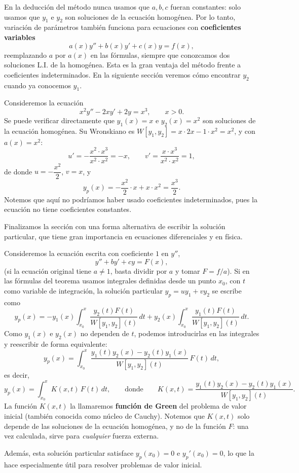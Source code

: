 \begin{remark}
    En la deducci\'on del m\'etodo nunca usamos que $a,b,c$ fueran constantes: solo usamos que $y_1$ e $y_2$ son soluciones de la ecuaci\'on homog\'enea. Por lo tanto, variaci\'on de par\'ametros tambi\'en funciona para ecuaciones con \textbf{coeficientes variables}
    \[
    a(x)y''+b(x)y'+c(x)y=f(x),
    \]
    reemplazando $a$ por $a(x)$ en las f\'ormulas, siempre que conozcamos dos soluciones L.I. de la homog\'enea. Esta es la gran ventaja del m\'etodo frente a coeficientes indeterminados. En la siguiente secci\'on veremos c\'omo encontrar $y_2$ cuando ya conocemos $y_1$.
\end{remark}

\begin{example}
    Consideremos la ecuaci\'on
    \[
    x^2y''-2xy'+2y=x^3,\qquad x>0.
    \]
    Se puede verificar directamente que $y_1(x)=x$ e $y_2(x)=x^2$ son soluciones de la ecuaci\'on homog\'enea. Su Wronskiano es $W[y_1,y_2]=x\cdot2x-1\cdot x^2=x^2$, y con $a(x)=x^2$:
    \[
    u'=-\dfrac{x^2\cdot x^3}{x^2\cdot x^2}=-x,\qquad v'=\dfrac{x\cdot x^3}{x^2\cdot x^2}=1,
    \]
    de donde $u=-\dfrac{x^2}{2}$, $v=x$, y
    \[
    y_p(x)=-\dfrac{x^2}{2}\cdot x+x\cdot x^2=\dfrac{x^3}{2}.
    \]
    Notemos que aqu\'i no podr\'iamos haber usado coeficientes indeterminados, pues la ecuaci\'on no tiene coeficientes constantes.
\end{example}

Finalizamos la secci\'on con una forma alternativa de escribir la soluci\'on particular, que tiene gran importancia en ecuaciones diferenciales y en f\'isica.

\begin{remark}
    Consideremos la ecuaci\'on escrita con coeficiente $1$ en $y''$,
    \[
    y''+by'+cy=F(x),
    \]
    (si la ecuaci\'on original tiene $a\neq1$, basta dividir por $a$ y tomar $F=f/a$). Si en las f\'ormulas del teorema usamos integrales definidas desde un punto $x_0$, con $t$ como variable de integraci\'on, la soluci\'on particular $y_p=uy_1+vy_2$ se escribe como
    \[
    y_p(x)=-y_1(x)\int_{x_0}^x \dfrac{y_2(t)F(t)}{W[y_1,y_2](t)}\,dt+y_2(x)\int_{x_0}^x \dfrac{y_1(t)F(t)}{W[y_1,y_2](t)}\,dt.
    \]
    Como $y_1(x)$ e $y_2(x)$ no dependen de $t$, podemos introducirlas en las integrales y reescribir de forma equivalente:
    \[
    y_p(x)=\int_{x_0}^x \dfrac{y_1(t)y_2(x)-y_2(t)y_1(x)}{W[y_1,y_2](t)}\,F(t)\,dt,
    \]
    es decir,
    \[
    y_p(x)=\int_{x_0}^x K(x,t)\,F(t)\,dt,\qquad\text{donde}\qquad K(x,t)=\dfrac{y_1(t)y_2(x)-y_2(t)y_1(x)}{W[y_1,y_2](t)}.
    \]
    La funci\'on $K(x,t)$ la llamaremos \textbf{funci\'on de Green} del problema de valor inicial (tambi\'en conocida como n\'ucleo de Cauchy). Notemos que $K(x,t)$ solo depende de las soluciones de la ecuaci\'on homog\'enea, y no de la funci\'on $F$: una vez calculada, sirve para \emph{cualquier} fuerza externa.

    Adem\'as, esta soluci\'on particular satisface $y_p(x_0)=0$ e $y_p'(x_0)=0$, lo que la hace especialmente \'util para resolver problemas de valor inicial.
\end{remark}

